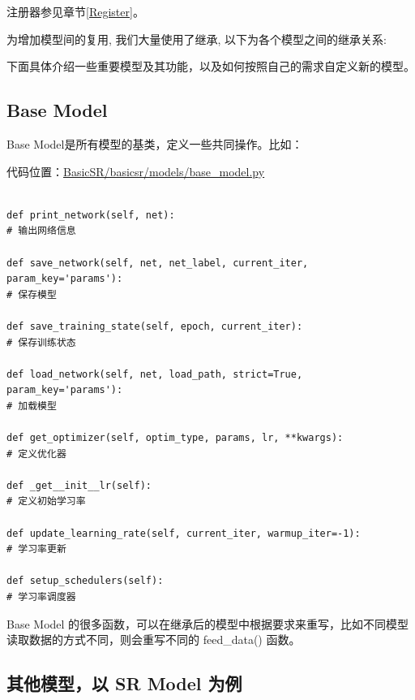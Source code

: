 \documentclass[../main.tex]{subfiles}
\begin{document}
\begin{note} %
	注册器参见章节\ref{Register}。
\end{note}

为增加模型间的复用, 我们大量使用了继承, 以下为各个模型之间的继承关系:


下面具体介绍一些重要模型及其功能，以及如何按照自己的需求自定义新的模型。

\subsection{Base Model}
Base Model是所有模型的基类，定义一些共同操作。比如：

代码位置：\href{https://github.com/XPixelGroup/BasicSR/blob/master/basicsr/models/base_model.py}{BasicSR/basicsr/models/base\_model.py}
\begin{verbatim}

def print_network(self, net):
# 输出网络信息

def save_network(self, net, net_label, current_iter, param_key='params'):
# 保存模型

def save_training_state(self, epoch, current_iter):
# 保存训练状态

def load_network(self, net, load_path, strict=True, param_key='params'):
# 加载模型

def get_optimizer(self, optim_type, params, lr, **kwargs):
# 定义优化器

def _get__init__lr(self):
# 定义初始学习率

def update_learning_rate(self, current_iter, warmup_iter=-1):
# 学习率更新

def setup_schedulers(self):
# 学习率调度器
\end{verbatim}

\begin{hl} %
Base Model 的很多函数，可以在继承后的模型中根据要求来重写，比如不同模型读取数据的方式不同，则会重写不同的 feed\_data() 函数。
\end{hl}

\subsection{其他模型，以 SR Model 为例}\label{Model:SR Model}
\end{document}
